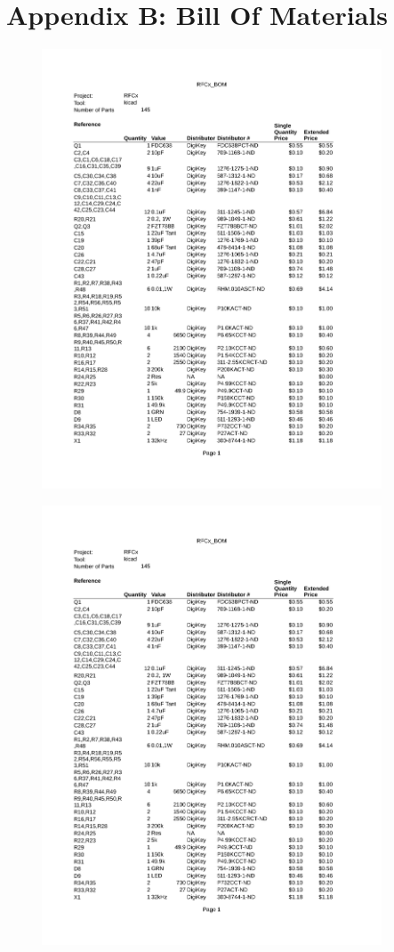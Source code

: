 \documentclass{article}
\begin{document}
{\section*{Appendix B: Bill Of Materials}
\begin{figure}[H]
	\centering
	\includegraphics[page=1,width=0.9\textwidth]{RFCx_BOM.pdf}
	\caption{}
	\label{fig:bom1}
\end{figure}
\begin{figure}[H]
	\centering
	\includegraphics[page=2,width=0.9\textwidth]{RFCx_BOM.pdf}

\end{figure}}
\end{document}
